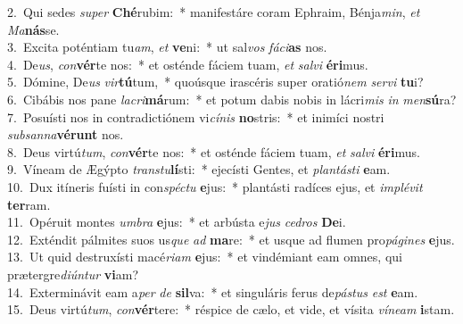 {2.~}Qui sedes \textit{su}\textit{per} \textbf{Ché}rubim:~* manifestáre coram Ephraim, Bénja\textit{min}, \textit{et} \textit{Ma}\textbf{nás}se.\\
{3.~}Excita poténtiam tu\textit{am}, \textit{et} \textbf{ve}ni:~* ut sal\textit{vos} \textit{fá}\textit{ci}\textbf{as} nos.\\
{4.~}De\textit{us}, \textit{con}\textbf{vér}te nos:~* et osténde fáciem tuam, \textit{et} \textit{sal}\textit{vi} \textbf{é}\textbf{ri}mus.\\
{5.~}Dómine, De\textit{us} \textit{vir}\textbf{tú}tum,~* quoúsque irascéris super oratió\textit{nem} \textit{ser}\textit{vi} \textbf{tu}i?\\
{6.~}Cibábis nos pane \textit{la}\textit{cri}\textbf{má}rum:~* et potum dabis nobis in lácri\textit{mis} \textit{in} \textit{men}\textbf{sú}ra?\\
{7.~}Posuísti nos in contradictiónem vi\textit{cí}\textit{nis} \textbf{no}stris:~* et inimíci nostri \textit{sub}\textit{san}\textit{na}\textbf{vé}\textbf{runt} nos.\\
{8.~}Deus virtú\textit{tum}, \textit{con}\textbf{vér}te nos:~* et osténde fáciem tuam, \textit{et} \textit{sal}\textit{vi} \textbf{é}\textbf{ri}mus.\\
{9.~}Víneam de Ægýpto \textit{tran}\textit{stu}\textbf{lí}sti:~* ejecísti Gentes, et \textit{plan}\textit{tá}\textit{sti} \textbf{e}am.\\
{10.~}Dux itíneris fuísti in con\textit{spé}\textit{ctu} \textbf{e}jus:~* plantásti radíces ejus, et \textit{im}\textit{plé}\textit{vit} \textbf{ter}ram.\\
{11.~}Opéruit montes \textit{um}\textit{bra} \textbf{e}jus:~* et arbústa e\textit{jus} \textit{ce}\textit{dros} \textbf{De}i.\\
{12.~}Exténdit pálmites suos us\textit{que} \textit{ad} \textbf{ma}re:~* et usque ad flumen pro\textit{pá}\textit{gi}\textit{nes} \textbf{e}jus.\\
{13.~}Ut quid destruxísti macé\textit{ri}\textit{am} \textbf{e}jus:~* et vindémiant eam omnes, qui prætergre\textit{di}\textit{ún}\textit{tur} \textbf{vi}am?\\
{14.~}Exterminávit eam a\textit{per} \textit{de} \textbf{sil}va:~* et singuláris ferus de\textit{pá}\textit{stus} \textit{est} \textbf{e}am.\\
{15.~}Deus virtú\textit{tum}, \textit{con}\textbf{vér}tere:~* réspice de cælo, et vide, et vísita \textit{ví}\textit{ne}\textit{am} \textbf{i}stam.\\
